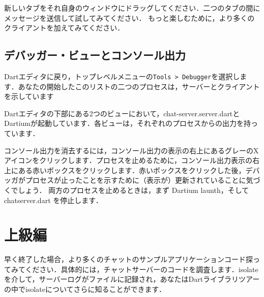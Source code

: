 新しいタブをそれ自身のウィンドウにドラッグしてください．二つのタブの間にメッセージを送信して試してみてください．
もっと楽しむために，より多くのクライアントを加えてみてください．


\subsection{デバッガー・ビューとコンソール出力}

Dartエディタに戻り，トップレベルメニューの\verb|Tools > Debugger|を選択します．あなたの開始したこのリストの二つのプロセスは，サーバーとクライアントを示しています


Dartエディタの下部にある2つのビューにおいて，chat-server.server.dartとDartiumが起動しています．各ビューは，それぞれのプロセスからの出力を持っています．


コンソール出力を消去するには，コンソール出力の表示の右上にあるグレーのXアイコンをクリックします．プロセスを止めるために，コンソール出力表示の右上にある赤いボックスをクリックします．赤いボックスをクリックした後，デバッガがプロセスが止ったことを示すために（表示が）更新されていることに気づくでしょう．
両方のプロセスを止めるときは，まず Dartium launth，そして chatserver.dart を停止します．


\section{上級編}

早く終了した場合，より多くのチャットのサンプルアプリケーションコード探ってみてください．具体的には，チャットサーバーのコードを調査します．isolateを介して，サーバーログがファイルに記録され，あなたはDartライブラリツアーの中でisolateについてさらに知ることができます．

\clearpage
